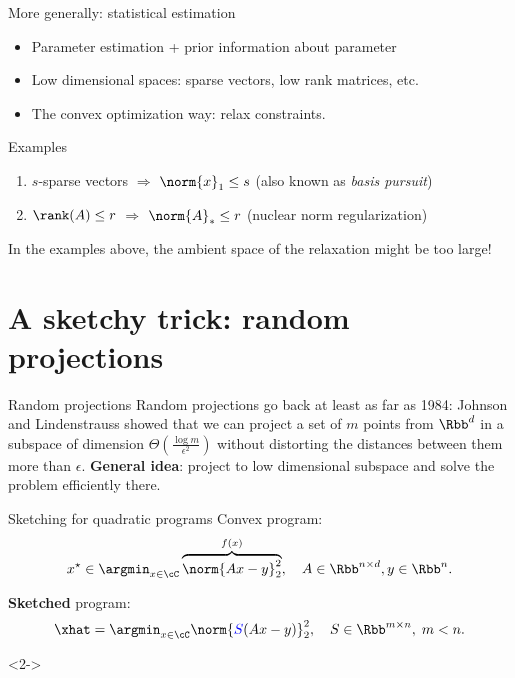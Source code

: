 \documentclass[11pt]{beamer}
\newcommand{\xstar}{x^{\star}}
\begin{document}
\begin{frame}{More generally: statistical estimation}
    \begin{itemize}
    \item Parameter estimation + prior information about parameter
    \item Low dimensional spaces: sparse vectors, low rank matrices, etc.
    \item The convex optimization way: relax constraints.
    \end{itemize}
    \begin{block}{Examples}
        \begin{enumerate}
            \item $s$-sparse vectors $\Rightarrow$ $\norm{x}_{1} \leq s$ 
            (also known as \textit{basis pursuit}) \\
            \item $\rank(A) \leq r$ $\Rightarrow$ $\norm{A}_{*} \leq r$ 
            (nuclear norm regularization)
        \end{enumerate}
    \end{block}
    In the examples above, the ambient space of the relaxation might be
    too large!
\end{frame}

\section{A sketchy trick: random projections}
\begin{frame}{Random projections}
    Random projections go back at least as far as 1984: Johnson and 
    Lindenstrauss showed that we can project a set of $m$ points from $\Rbb^d$
    in a subspace of dimension $\Theta\left( \frac{\log m}{\epsilon^2} \right)$ 
    without distorting the distances between them more than $\epsilon$.
    \linebreak[2]
    \textbf{General idea}: project to low dimensional subspace and solve the 
    problem efficiently there.
\end{frame}

\begin{frame}{Sketching for quadratic programs}
    Convex program:
    \[
        \xstar \in \argmin_{x \in \cC} \overbrace{\norm{Ax - y}_2^2}^{f(x)},
        \quad A \in \Rbb^{n \times d}, y \in \Rbb^n.
    \]
    
    \textbf{Sketched} program:
    \[
        \xhat = \argmin_{x \in \cC} \norm{{\color{blue} S}(Ax - y)}_2^2, 
        \quad S \in \Rbb^{m \times n}, \; m < n.
    \]
    
    \only{\textbf{\color{red} Question:}
    \[
        m \geq \; ??? \Rightarrow f(\xhat) \leq (1 + \delta)^2 f(\xstar)
    \]}<2->
\end{frame}
\end{document}
